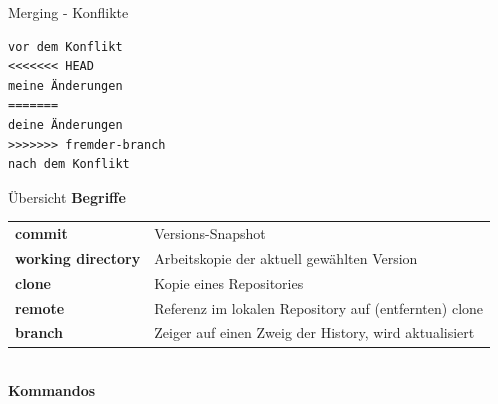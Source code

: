 \documentclass[compress,t,usenames,dvipsnames]{beamer}
\begin{document}
\begin{frame}[fragile]{Merging - Konflikte}

    \begin{verbatim}
vor dem Konflikt
<<<<<<< HEAD
meine Änderungen
=======
deine Änderungen
>>>>>>> fremder-branch
nach dem Konflikt
    \end{verbatim}
\end{frame}

\begin{frame}{Übersicht}
    \textbf{Begriffe}\\[0.5em]

    {\scriptsize
        \begin{tabular}{p{2.5cm}l}
            \textbf{commit}
                & Versions-Snapshot\\
            \textbf{working directory}
                & Arbeitskopie der aktuell gewählten Version\\
            \textbf{clone}
                & Kopie eines Repositories\\
            \textbf{remote}
                & Referenz im lokalen Repository auf (entfernten) clone\\
            \textbf{branch}
                & Zeiger auf einen Zweig der History, wird aktualisiert\\
        \end{tabular}
    }\\[1em]

    \textbf{Kommandos}\\[0.5em]


\end{frame}
\end{document}
